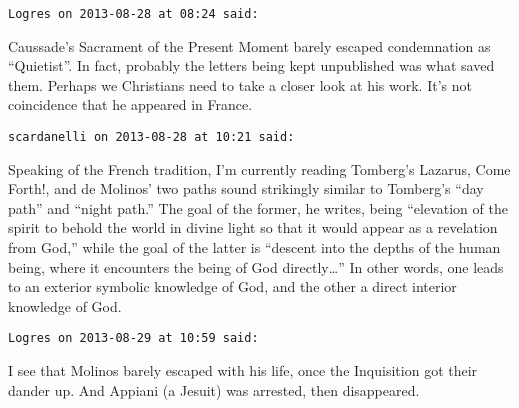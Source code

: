 \begin{footnotesize}\begin{sffamily}



\texttt{Logres on 2013-08-28 at 08:24 said: }

Caussade's Sacrament of the Present Moment barely escaped condemnation as “Quietist”. In fact, probably the letters being kept unpublished was what saved them. Perhaps we Christians need to take a closer look at his work. It's not coincidence that he appeared in France.


\hfill

\texttt{scardanelli on 2013-08-28 at 10:21 said: }

Speaking of the French tradition, I'm currently reading Tomberg's Lazarus, Come Forth!, and de Molinos' two paths sound strikingly similar to Tomberg's “day path” and “night path.” The goal of the former, he writes, being “elevation of the spirit to behold the world in divine light so that it would appear as a revelation from God,” while the goal of the latter is “descent into the depths of the human being, where it encounters the being of God directly…” In other words, one leads to an exterior symbolic knowledge of God, and the other a direct interior knowledge of God.


\hfill

\texttt{Logres on 2013-08-29 at 10:59 said: }

I see that Molinos barely escaped with his life, once the Inquisition got their dander up. And Appiani (a Jesuit) was arrested, then disappeared.


\end{sffamily}\end{footnotesize}
